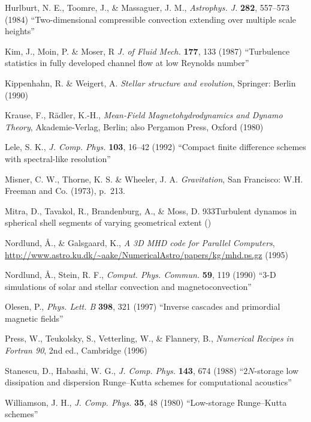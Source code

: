 \documentclass[\mydriver,12pt,twoside,notitlepage,a4paper]{article}
\begin{document}
\begin{thebibliography}{99}
Hurlburt, N. E., Toomre, J., \& Massaguer, J. M.,
  \emph{Astrophys. J.} \textbf{282}, 557--573 (1984)
  ``Two-dimensional compressible convection extending over multiple scale
  heights''

 Kim, J., Moin, P. \& Moser, R
\emph{J. of Fluid Mech.} \textbf{177}, 133 (1987)
``Turbulence statistics in fully developed channel flow at low Reynolds number''

 Kippenhahn, R. \& Weigert, A.
  \emph{Stellar structure and evolution}, Springer: Berlin (1990)

 Krause, F., R\"adler, K.-H.,
  \emph{Mean-Field Magneto\-hy\-dro\-dy\-na\-mics and Dynamo Theory\/},
  Akademie-Verlag, Berlin; also Pergamon Press, Oxford (1980)

Lele, S. K.,
  \emph{J. Comp. Phys.} \textbf{103}, 16--42 (1992)
  ``Compact finite difference schemes with spectral-like resolution''

 Misner, C. W., Thorne, K. S. \& Wheeler, J. A.
  \emph{Gravitation},
  San Francisco: W.H. Freeman and Co. (1973), p.~213.

 Mitra, D., Tavakol, R., Brandenburg, A., \& Moss, D.
{933}{Turbulent dynamos in spherical shell segments of varying geometrical extent} ()

 Nordlund, \AA., \& Galsgaard, K.,
{\it A 3D MHD code for Parallel Computers},
{\url{http://www.astro.ku.dk/~aake/NumericalAstro/papers/kg/mhd.ps.gz}}
(1995)

 Nordlund, \AA., Stein, R. F.,
  \emph{Comput. Phys. Commun.} \textbf{59}, 119 (1990)
  ``3-D simulations of solar and stellar convection and magnetoconvection''

 Olesen, P., \emph{Phys. Lett. B} \textbf{398}, 321 (1997)
  ``Inverse cascades and primordial magnetic fields''

 Press, W., Teukolsky, S., Vetterling, W., \& Flannery, B.,
  \emph{Numerical Recipes in Fortran 90}, 2nd ed., Cambridge (1996)

 Stanescu, D., Habashi, W. G.,
  \emph{J. Comp. Phys.} \textbf{143}, 674 (1988)
  ``$2N$-storage low dissipation and dispersion Runge--Kutta
  schemes for computational acoustics''

 Williamson, J. H.,
  \emph{J. Comp. Phys.} \textbf{35}, 48 (1980)
  ``Low-storage Runge--Kutta schemes''


\end{thebibliography}
\end{document}
